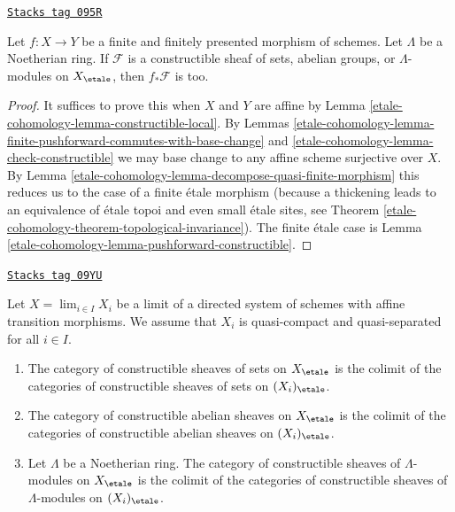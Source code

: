 \begin{lemma}
\label{etale-cohomology-lemma-finite-pushforward-constructible}
\href{https://stacks.math.columbia.edu/tag/095R}{\texttt{Stacks tag 095R}}

Let $f : X \to Y$ be a finite and finitely presented morphism of schemes.
Let $\Lambda$ be a Noetherian ring. If $\mathcal{F}$ is a constructible
sheaf of sets, abelian groups, or $\Lambda$-modules on $X_\etale$,
then $f_*\mathcal{F}$ is too.
\end{lemma}

\begin{proof}
It suffices to prove this when $X$ and $Y$ are affine by
Lemma \ref{etale-cohomology-lemma-constructible-local}.
By
Lemmas \ref{etale-cohomology-lemma-finite-pushforward-commutes-with-base-change} and
\ref{etale-cohomology-lemma-check-constructible} we may base change to any
affine scheme surjective over $X$. By
Lemma \ref{etale-cohomology-lemma-decompose-quasi-finite-morphism}
this reduces us to the case of a finite \'etale morphism
(because a thickening leads to an equivalence of \'etale topoi
and even small \'etale sites, see
Theorem \ref{etale-cohomology-theorem-topological-invariance}).
The finite \'etale case is
Lemma \ref{etale-cohomology-lemma-pushforward-constructible}.
\end{proof}

\begin{lemma}
\label{etale-cohomology-lemma-category-is-colimit}
\href{https://stacks.math.columbia.edu/tag/09YU}{\texttt{Stacks tag 09YU}}

Let $X = \lim_{i \in I} X_i$ be a limit of a directed
system of schemes with affine transition morphisms.
We assume that $X_i$ is quasi-compact and quasi-separated
for all $i \in I$.
\begin{enumerate}
\item The category of constructible sheaves of sets on $X_\etale$
is the colimit of the categories of constructible sheaves of sets
on $(X_i)_\etale$.
\item The category of constructible abelian sheaves on $X_\etale$
is the colimit of the categories of constructible abelian sheaves
on $(X_i)_\etale$.
\item Let $\Lambda$ be a Noetherian ring. The category of constructible
sheaves of $\Lambda$-modules on $X_\etale$ is the colimit of the
categories of constructible sheaves of $\Lambda$-modules on $(X_i)_\etale$.
\end{enumerate}
\end{lemma}


